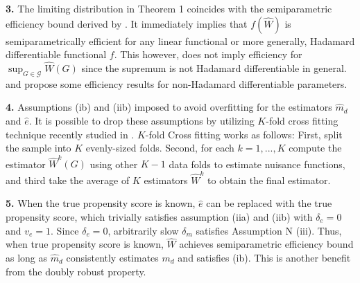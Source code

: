 \documentclass[12pt,oneside,reqno,english]{amsart}
\theoremstyle{definition}
\begin{document}
\textbf{3.} The limiting distribution in Theorem 1 coincides with the semiparametric efficiency bound derived by \cite{Hahn:98}. It immediately implies
that $f(\hat{W})$ is semiparametrically efficient for any linear functional or more generally, Hadamard differentiable functional $f$. 
This however, does not imply efficiency for $\sup_{G\in \mathcal{G}}\hat{W}(G)$ since the supremum is not Hadamard differentiable in general. 
\cite{Song:14} and \cite{Fang:14} propose some efficiency results for non-Hadamard differentiable parameters.

\textbf{4.} Assumptions (ib) and (iib) imposed to avoid overfitting for the estimators $\hat{m}_{d}$ and $\hat{e}$. 
It is possible to drop these assumptions by utilizing $K$-fold cross fitting technique recently studied in
\cite{CCDDHN:17}. $K$-fold Cross fitting works as follows:  
First, split the sample into $K$ evenly-sized folds. Second, for each $k=1,...,K$ compute the estimator $\hat{W}^{k}(G)$ using other $K-1$ data folds to estimate nuisance functions, and third take the average of $K$ estimators $\hat{W}^{k}$ to obtain the final estimator. 

\textbf{5.} When the true propensity score is known, $\hat{e}$ can be replaced with the true propensity score, which trivially satisfies assumption (iia) and (iib)
with $\delta_{e}=0$ and $v_{e}=1$. Since $\delta_{e}=0$, arbitrarily slow $\delta_{m}$ satisfies Assumption N (iii). 
Thus, when true propensity score is known, $\hat{W}$ achieves semiparametric efficiency bound as long as $\hat{m}_{d}$ consistently estimates $m_{d}$ and satisfies 
(ib). This is another benefit from the doubly robust property. 
\end{document}
